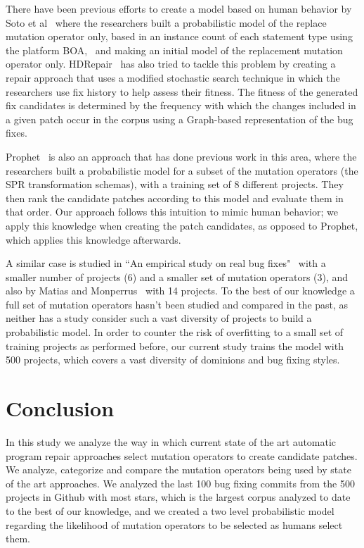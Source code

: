 \documentclass[conference]{IEEEtran}
\begin{document}
There have been previous efforts to create a model based on human behavior by Soto et al~\cite{Soto15} 
where the researchers built a probabilistic model of the replace mutation 
operator only, based in 
an instance count of each statement type using the platform 
BOA,~\cite{dyer2013} and making an initial model of the replacement mutation 
operator only. HDRepair~\cite{xuan16} has also tried to tackle this problem by 
creating a repair approach that uses a modified stochastic search
technique in which the researchers use fix history
to help assess their fitness. The fitness of the generated
fix candidates is determined by the frequency with which the changes included in a given patch occur in the corpus using a Graph-based representation of the bug fixes.

Prophet~\cite{long15} is also an approach that has done previous work in this 
area, where the researchers built a 
probabilistic model for a subset of the mutation operators (the SPR transformation schemas), with a training set 
of 8 different projects. They then rank the candidate patches according to this model and evaluate them in that order. Our approach follows this intuition to mimic human behavior; we apply this knowledge when creating the patch candidates, as opposed to Prophet, which applies this knowledge afterwards. 

A similar case is studied in ``An empirical study on 
real bug fixes"~\cite{zhong15} with a smaller number of projects (6) and a 
smaller set of 
mutation operators (3), and also by Matias and Monperrus~\cite{matias15} with 14 
projects. To the best of our knowledge a full set of mutation 
operators hasn't been studied and compared in the past, as neither has a study 
consider such a vast diversity of projects to build a probabilistic model. In 
order to counter the 
risk of overfitting to a small set of training projects as performed before, our 
current study trains the model with 500 projects, which covers a vast diversity 
of dominions and bug fixing styles.


\section{Conclusion} \label{conclusion}
In this study we analyze the way in which current state of the art automatic 
program repair approaches select mutation operators to create candidate 
patches. We analyze, categorize and compare the mutation operators being used by 
state of the art approaches. We analyzed the last 100 bug fixing commits from the
500 projects in Github with most stars, which is the largest corpus analyzed to date
to the best of our knowledge, and we created a two level probabilistic model regarding 
the likelihood of mutation operators to be selected as humans select them.
\end{document}
